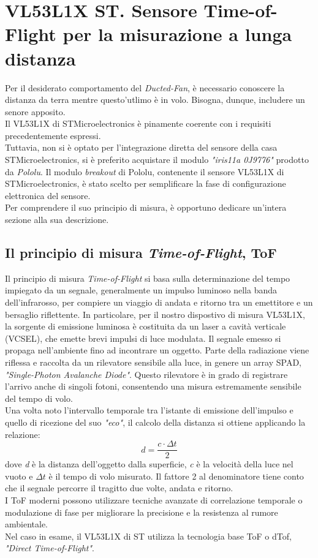 \documentclass[11pt]{report}
\begin{document}
\section{VL53L1X ST. Sensore Time-of-Flight per la misurazione a lunga distanza}
Per il desiderato comportamento del \textit{Ducted-Fan}, è necessario conoscere la distanza da terra mentre questo'utlimo è in volo. Bisogna, dunque, includere un senore apposito.\\
Il VL53L1X di STMicroelectronics è pinamente coerente con i requisiti precedentemente espressi.\\
Tuttavia, non si è optato per l'integrazione diretta del sensore della casa STMicroelectronics, si è preferito acquistare il modulo \textit{"iris11a 0J9776"} prodotto da \textit{Pololu}.
Il modulo \textit{breakout} di Pololu, contenente il sensore VL53L1X di STMicroelectronics, è stato scelto per semplificare la fase di configurazione elettronica del sensore.\\
Per comprendere il suo principio di misura, è opportuno dedicare un'intera sezione alla sua descrizione.

\subsection{Il principio di misura \textit{Time-of-Flight}, ToF}
Il principio di misura \textit{Time-of-Flight} si basa sulla determinazione del tempo impiegato da un segnale, generalmente un impulso luminoso nella banda dell'infrarosso, per compiere
un viaggio di andata e ritorno tra un emettitore e un bersaglio riflettente. In particolare, per il nostro dispostivo di misura VL53L1X, la sorgente di emissione luminosa è costituita da
un laser a cavità verticale (VCSEL), che emette brevi impulsi di luce modulata.
Il segnale emesso si propaga nell'ambiente fino ad incontrare un oggetto. Parte della radiazione viene riflessa e raccolta da un rilevatore sensibile alla luce, in genere un array SPAD,
\textit{"Single-Photon Avalanche Diode"}. Questo rilevatore è in grado di registrare l'arrivo anche di singoli fotoni, consentendo una misura estremamente sensibile del tempo di volo.\\
Una volta noto l'intervallo temporale tra l'istante di emissione dell'impulso e quello di ricezione del suo \textit{"eco"}, il calcolo della distanza si ottiene applicando la relazione:
\begin{equation}
    d = \frac{c \cdot \Delta t}{2}
\end{equation}
dove \textit{d} è la distanza dell'oggetto dalla superficie, \textit{c} è la velocità della luce nel vuoto e $\Delta t$ è il tempo di volo misurato. Il fattore 2 al denominatore tiene conto
che il segnale percorre il tragitto due volte, andata e ritorno.\\
I ToF moderni possono utilizzare tecniche avanzate di correlazione temporale o modulazione di fase per migliorare la precisione e la resistenza al rumore ambientale.\\
Nel caso in esame,  il VL53L1X di ST utilizza la tecnologia base ToF o dTof, \textit{"Direct Time-of-Flight"}.\\
\end{document}
